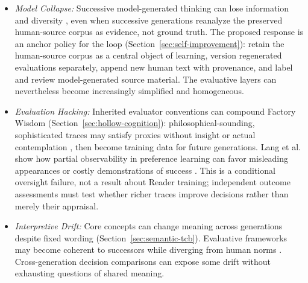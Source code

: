 \documentclass[11pt]{article}
\begin{document}
\begin{itemize}
    \item \emph{Model Collapse:} Successive model-generated thinking can lose
information and diversity \cite{shumailov2023curse}, even when successive
generations reanalyze the preserved human-source corpus as evidence, not ground truth. The
proposed response is an anchor policy for the loop
(Section~\ref{sec:self-improvement}): retain the human-source corpus as a central object of learning, version
regenerated evaluations separately, append new human text with provenance, and
label and review model-generated source material. The
evaluative layers can nevertheless become increasingly simplified and
homogeneous.

    \item \emph{Evaluation Hacking:} Inherited evaluator conventions can compound
Factory Wisdom (Section~\ref{sec:hollow-cognition}): philosophical-sounding,
sophisticated traces may satisfy proxies without insight or actual
contemplation \cite{gao2025reward}, then become training data for future
generations. Lang et al. show how partial observability in preference learning
can favor misleading appearances or costly demonstrations of success
\cite{lang2024partialobservability}. This is a conditional oversight failure,
not a result about Reader training; independent outcome assessments must test
whether richer traces improve decisions rather than merely their appraisal.

    \item \emph{Interpretive Drift:} Core concepts can change meaning across
generations despite fixed wording (Section~\ref{sec:semantic-tcb}). Evaluative
frameworks may become coherent to successors while diverging from human norms
\cite{deblanc2011ontological,bostrom2014superintelligence}. Cross-generation decision comparisons can
expose some drift without exhausting questions of shared meaning.
\end{itemize}
\end{document}
